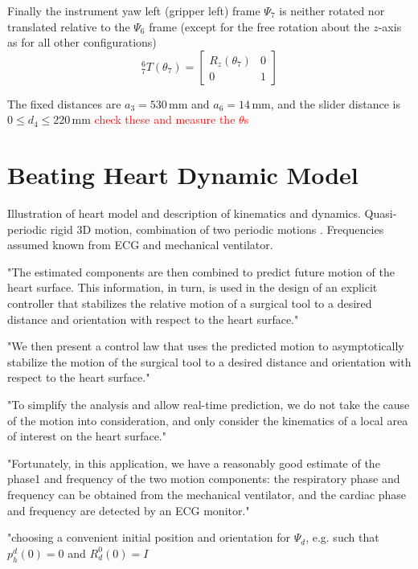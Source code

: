 Finally the instrument yaw left (gripper left) frame $\Psi_7$ is neither rotated nor translated relative to the $\Psi_6$ frame (except for the free rotation about the $z$-axis as for all other configurations)
\begin{equation}
^6_7 T(\theta_7) = 
\begin{bmatrix}
R_z(\theta_7) & 0\\
0 & 1
\end{bmatrix}
\end{equation}

The fixed distances are $a_3=530$\,mm and $a_6=14$\,mm, and the slider distance is $0\leq d_4 \leq 220$\,mm \textcolor{red}{check these and measure the $\theta$s} 


\section{Beating Heart Dynamic Model}
Illustration of heart model and description of kinematics and dynamics.
Quasi-periodic rigid 3D motion, combination of two periodic motions \cite{bib:heart_berkeley}. Frequencies assumed known from ECG and mechanical ventilator.

"The estimated components are then combined to predict future motion of the heart surface. This information, in turn, is used in the design of an explicit controller that stabilizes the relative motion of a surgical tool to a desired distance and orientation with respect to the heart surface."

"We then present a control law that uses the predicted motion to asymptotically stabilize the motion of the surgical tool to a desired distance and orientation with respect to the heart surface."

"To simplify the analysis and allow real-time prediction, we do not take the cause of the motion into consideration, and only consider the kinematics of a local area of interest on the heart surface."

"Fortunately, in this application, we have a reasonably good estimate of the phase1 and frequency of the two motion components: the respiratory phase and frequency can be obtained from the mechanical ventilator, and the cardiac phase and frequency are detected by an ECG monitor."

"choosing a convenient initial position and orientation for $\Psi_d$, e.g. such that $p^d_h(0)=0$ and $R^0_d(0) = I$

